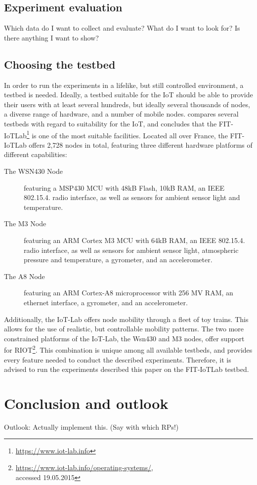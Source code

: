 \documentclass{acm_proc_article-sp}
\begin{document}
\subsection{Experiment evaluation}
\label{subsec:evaluation}
Which data do I want to collect and evaluate? What do I want to look for? Is there anything I want to show?


\subsection{Choosing the testbed}
\label{subsec:testbed_choice}

In order to run the experiments in a lifelike, but still controlled environment, a testbed is needed. Ideally, a testbed suitable for the IoT should be able to provide their users with at least several hundreds, but ideally several thousands of nodes, a diverse range of hardware, and a number of mobile nodes. \cite{testbed-survey} compares several testbeds with regard to suitability for the IoT, and concludes that the FIT-IoTLab\footnote{\url{https://www.iot-lab.info}} is one of the most suitable facilities. Located all over France, the FIT-IoTLab offers 2,728 nodes in total, featuring three different hardware platforms of different capabilities:
\begin{description}
\item[The WSN430 Node] featuring a MSP430 MCU with 48kB Flash, 10kB RAM, an IEEE 802.15.4. radio interface, as well as sensors for ambient sensor light and temperature.
\item[The M3 Node] featuring an ARM Cortex M3 MCU with 64kB RAM, an IEEE 802.15.4. radio interface, as well as sensors for ambient sensor light, atmospheric pressure and temperature, a gyrometer, and an accelerometer.
\item[The A8 Node] featuring an ARM Cortex-A8 microprocessor with 256 MV RAM, an ethernet interface, a gyrometer, and an accelerometer.
\end{description}
Additionally, the IoT-Lab offers node mobility through a fleet of toy trains. This allows for the use of realistic, but controllable mobility patterns.
The two more constrained platforms of the IoT-Lab, the Wsn430 and M3 nodes, offer support for RIOT\footnote{\url{https://www.iot-lab.info/operating-systems/}, \\accessed 19.05.2015}.
This combination is unique among all available testbeds, and provides every feature needed to conduct the described experiments. Therefore, it is advised to run the experiments described this paper on the FIT-IoTLab testbed.

\section{Conclusion and outlook}
\label{sec:Conclusion}

Outlook: Actually implement this. (Say with which RPs!)



\end{document}

